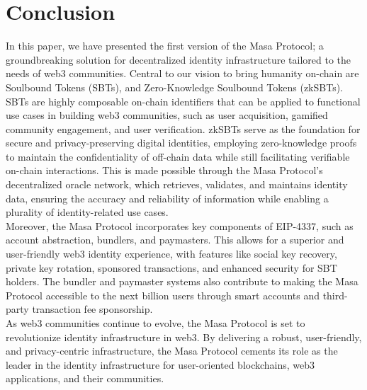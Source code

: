 \documentclass{article}
\begin{document}
\section{Conclusion}
In this paper, we have presented the first version of the Masa Protocol; a groundbreaking solution for decentralized identity infrastructure tailored to the needs of web3 communities. Central to our vision to bring humanity on-chain are Soulbound Tokens (SBTs), and Zero-Knowledge Soulbound Tokens (zkSBTs).
\\
\newline
SBTs are highly composable on-chain identifiers that can be applied to functional use cases in building web3 communities, such as user acquisition, gamified community engagement, and user verification. zkSBTs serve as the foundation for secure and privacy-preserving digital identities, employing zero-knowledge proofs to maintain the confidentiality of off-chain data while still facilitating verifiable on-chain interactions. This is made possible through the Masa Protocol's decentralized oracle network, which retrieves, validates, and maintains identity data, ensuring the accuracy and reliability of information while enabling a plurality of identity-related use cases.
\\
\newline
Moreover, the Masa Protocol incorporates key components of EIP-4337, such as account abstraction, bundlers, and paymasters. This allows for a superior and user-friendly web3 identity experience, with features like social key recovery, private key rotation, sponsored transactions, and enhanced security for SBT holders. The bundler and paymaster systems also contribute to making the Masa Protocol accessible to the next billion users through smart accounts and third-party transaction fee sponsorship.
\\
\newline
As web3 communities continue to evolve, the Masa Protocol is set to revolutionize identity infrastructure in web3. By delivering a robust, user-friendly, and privacy-centric infrastructure, the Masa Protocol cements its role as the leader in the identity infrastructure for user-oriented blockchains, web3 applications, and their communities.
\appendix
\end{document}
